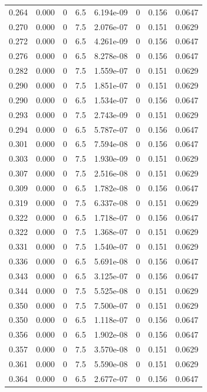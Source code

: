 \documentclass[preview]{standalone}
\begin{document}
{{{\begin{tabular}{L{1.2cm}C{1.2cm} C{0.3cm}C{0.5cm} C{1.4cm}C{1.4cm} C{1.4cm}C{1.4cm}}
  0.264  &  0.000  & 0     & 6.5 &  6.194e-09  & 0  & 0.156 &  0.0647   \\ 
  0.270  &  0.000  & 0     & 7.5 &  2.076e-07  & 0  & 0.151 &  0.0629   \\ 
  0.272  &  0.000  & 0     & 6.5 &  4.261e-09  & 0  & 0.156 &  0.0647   \\ 
  0.276  &  0.000  & 0     & 6.5 &  8.278e-08  & 0  & 0.156 &  0.0647   \\ 
  0.282  &  0.000  & 0     & 7.5 &  1.559e-07  & 0  & 0.151 &  0.0629   \\ 
  0.290  &  0.000  & 0     & 7.5 &  1.851e-07  & 0  & 0.151 &  0.0629   \\ 
  0.290  &  0.000  & 0     & 6.5 &  1.534e-07  & 0  & 0.156 &  0.0647   \\ 
  0.293  &  0.000  & 0     & 7.5 &  2.743e-09  & 0  & 0.151 &  0.0629   \\ 
  0.294  &  0.000  & 0     & 6.5 &  5.787e-07  & 0  & 0.156 &  0.0647   \\ 
  0.301  &  0.000  & 0     & 6.5 &  7.594e-08  & 0  & 0.156 &  0.0647   \\ 
  0.303  &  0.000  & 0     & 7.5 &  1.930e-09  & 0  & 0.151 &  0.0629   \\ 
  0.307  &  0.000  & 0     & 7.5 &  2.516e-08  & 0  & 0.151 &  0.0629   \\ 
  0.309  &  0.000  & 0     & 6.5 &  1.782e-08  & 0  & 0.156 &  0.0647   \\ 
  0.319  &  0.000  & 0     & 7.5 &  6.337e-08  & 0  & 0.151 &  0.0629   \\ 
  0.322  &  0.000  & 0     & 6.5 &  1.718e-07  & 0  & 0.156 &  0.0647   \\ 
  0.322  &  0.000  & 0     & 7.5 &  1.368e-07  & 0  & 0.151 &  0.0629   \\ 
  0.331  &  0.000  & 0     & 7.5 &  1.540e-07  & 0  & 0.151 &  0.0629   \\ 
  0.336  &  0.000  & 0     & 6.5 &  5.691e-08  & 0  & 0.156 &  0.0647   \\ 
  0.343  &  0.000  & 0     & 6.5 &  3.125e-07  & 0  & 0.156 &  0.0647   \\ 
  0.344  &  0.000  & 0     & 7.5 &  5.525e-08  & 0  & 0.151 &  0.0629   \\ 
  0.350  &  0.000  & 0     & 7.5 &  7.500e-07  & 0  & 0.151 &  0.0629   \\ 
  0.350  &  0.000  & 0     & 6.5 &  1.118e-07  & 0  & 0.156 &  0.0647   \\ 
  0.356  &  0.000  & 0     & 6.5 &  1.902e-08  & 0  & 0.156 &  0.0647   \\ 
  0.357  &  0.000  & 0     & 7.5 &  3.570e-08  & 0  & 0.151 &  0.0629   \\ 
  0.361  &  0.000  & 0     & 7.5 &  5.590e-08  & 0  & 0.151 &  0.0629   \\ 
  0.364  &  0.000  & 0     & 6.5 &  2.677e-07  & 0  & 0.156 &  0.0647   \\ 
\hline 
\end{tabular} 

}}}
\end{document}
